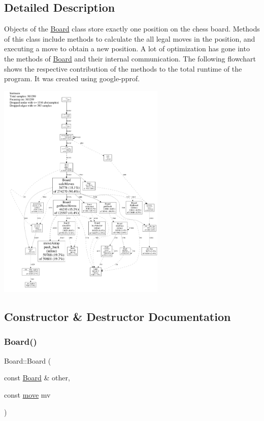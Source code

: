 \subsection{Detailed Description}
Objects of the \hyperlink{classBoard}{Board} class store exactly one position on the chess board. Methods of this class include methods to calculate the all legal moves in the position, and executing a move to obtain a new position. A lot of optimization has gone into the methods of \hyperlink{classBoard}{Board} and their internal communication. The following flowchart shows the respective contribution of the methods to the total runtime of the program. It was created using google-\/pprof.  
\begin{DoxyImageNoCaption}
  \mbox{\includegraphics[width=8cm]{../../img/timing.png}}
\end{DoxyImageNoCaption}
 

\subsection{Constructor \& Destructor Documentation}
\mbox{\label{classBoard_a632d2e0f09a1ad6fe835dc11ef1238cc}} 
\subsubsection{\texorpdfstring{Board()}{Board()}\hspace{0.1cm}{\footnotesize\ttfamily [1/2]}}
{\footnotesize\ttfamily Board\+::\+Board (\begin{DoxyParamCaption}\item[{const \hyperlink{classBoard}{Board} \&}]{other,  }\item[{const \hyperlink{structmove}{move}}]{mv }\end{DoxyParamCaption})\hspace{0.3cm}{\ttfamily [private]}}



